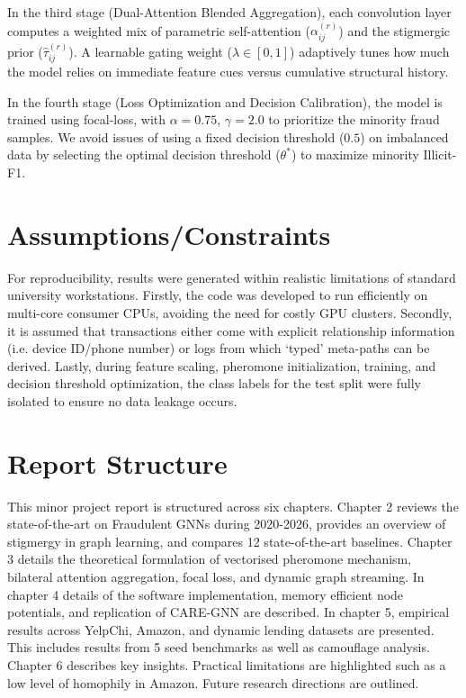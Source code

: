 In the third stage (Dual-Attention Blended Aggregation), each convolution layer computes a weighted mix of parametric self-attention ($\alpha_{ij}^{(r)}$) and the stigmergic prior ($\hat{\tau}_{ij}^{(r)}$). A learnable gating weight ($\lambda \in [0, 1]$) adaptively tunes how much the model relies on immediate feature cues versus cumulative structural history.

In the fourth stage (Loss Optimization and Decision Calibration), the model is trained using focal-loss, with $\alpha = 0.75$, $\gamma = 2.0$ to prioritize the minority fraud samples. We avoid issues of using a fixed decision threshold ($0.5$) on imbalanced data by selecting the optimal decision threshold ($\theta^*$) to maximize minority Illicit-F1.

\section[Assumptions/Constraints]{\textbf{Assumptions/Constraints}}
\label{sec:constraints}

For reproducibility, results were generated within realistic limitations of standard university workstations. Firstly, the code was developed to run efficiently on multi-core consumer CPUs, avoiding the need for costly GPU clusters. Secondly, it is assumed that transactions either come with explicit relationship information (i.e. device ID/phone number) or logs from which `typed' meta-paths can be derived. Lastly, during feature scaling, pheromone initialization, training, and decision threshold optimization, the class labels for the test split were fully isolated to ensure no data leakage occurs.

\section[Report Structure]{\textbf{Report Structure}}
\label{sec:organization}

This minor project report is structured across six chapters. Chapter 2 reviews the state-of-the-art on Fraudulent GNNs during 2020-2026, provides an overview of stigmergy in graph learning, and compares 12 state-of-the-art baselines. Chapter 3 details the theoretical formulation of vectorised pheromone mechanism, bilateral attention aggregation, focal loss, and dynamic graph streaming. In chapter 4 details of the software implementation, memory efficient node potentials, and replication of CARE-GNN are described. In chapter 5, empirical results across YelpChi, Amazon, and dynamic lending datasets are presented. This includes results from 5 seed benchmarks as well as camouflage analysis. Chapter 6 describes key insights. Practical limitations are highlighted such as a low level of homophily in Amazon. Future research directions are outlined.